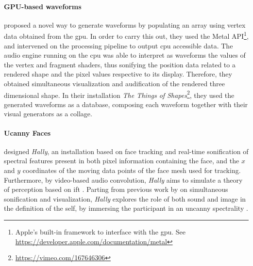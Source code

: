 \paragraph{GPU-based waveforms}
\textcite{icmc/bbp2372.2016.056} proposed a novel way to generate waveforms by populating an array using vertex data obtained from the \gls{gpu}. In order to carry this out, they used the Metal API\footnote{Apple's built-in framework to interface with the \gls{gpu}. See \url{https://developer.apple.com/documentation/metal}}, and intervened on the processing pipeline to output \gls{cpu} accessible data. The audio engine running on the \gls{cpu} was able to interpret as waveforms the values of the vertex and fragment shaders, thus sonifying the position data related to a rendered shape and the pixel values respective to its display. Therefore, they obtained simultaneous visualization and audification of the rendered three dimensional shape. In their installation \textit{The Things of Shapes}\footnote{\url{https://vimeo.com/167646306}}, they used the generated waveforms as a database, composing each waveform together with their visual generators as a collage.

\paragraph{Ucanny Faces}
\textcite{fdch/installation/spectral} designed \textit{Hally}, an installation based on face tracking and real-time sonification of spectral features present in both pixel information containing the face, and the $x$ and $y$ coordinates of the moving data points of the face mesh used for tracking. Furthermore, by video-based audio convolution, \textit{Hally} aims to simulate a theory of perception based on \gls{ift} \parencite{connes:shapes}. Parting from previous work by \textcite{Sch07:How} on simultaneous sonification and visualization, \textit{Hally} explores the role of both sound and image in the definition of the self, by immersing the participant in an uncanny spectrality \parencite{fdch/papers/spectral}.


% 
% 




